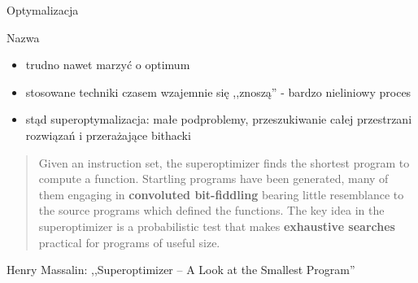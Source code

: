 \begin{frame}{Optymalizacja}
	\begin{block}{Nazwa}
		\begin{itemize}
			\item trudno nawet marzyć o optimum
			\item stosowane techniki czasem wzajemnie się ,,znoszą'' - bardzo nieliniowy proces
			\item stąd superoptymalizacja: małe podproblemy, przeszukiwanie całej przestrzani rozwiązań i przerażające bithacki
		\end{itemize}
		\begin{quote}
			Given an instruction set, the superoptimizer finds the shortest program to compute a function.
			Startling programs have been generated, many of them engaging in \textbf{convoluted bit-fiddling} bearing little resemblance to the source programs which defined the functions.
			The key idea in the superoptimizer is a probabilistic test that makes \textbf{exhaustive searches} practical for programs of useful size.
		\end{quote}
		Henry Massalin: ,,Superoptimizer -- A Look at the Smallest Program''
	\end{block}
\end{frame}
